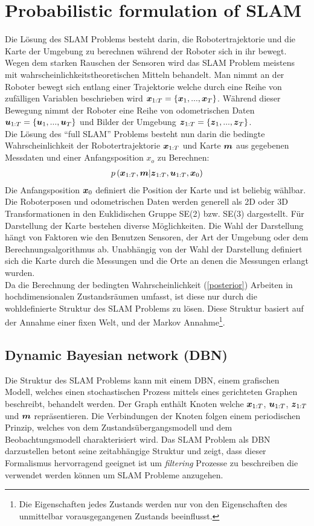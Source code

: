 \documentclass[12pt]{article}
\renewcommand*\vec[1]{{\mbox{\boldmath\ensuremath{#1}}}}
\begin{document}
\section{Probabilistic formulation of SLAM}
Die Lösung des SLAM Problems besteht darin, die Robotertrajektorie und die Karte der Umgebung zu berechnen während der Roboter sich in ihr bewegt.
Wegen dem starken Rauschen der Sensoren wird das SLAM Problem meistens mit wahrscheinlichkeitstheoretischen Mitteln behandelt. Man nimmt an der
Roboter bewegt sich entlang einer Trajektorie welche durch eine Reihe von zufälligen Variablen beschrieben wird
$\vec x_{1:T} = \left\{\vec x_1,...,\vec x_T\right\}$. Während dieser Bewegung nimmt der Roboter eine Reihe von odometrischen Daten
$\vec u_{1:T} = \left\{\vec u_1,...,\vec u_T\right\}$ und Bilder der Umgebung $\vec z_{1:T} = \left\{\vec z_1,...,\vec z_T\right\}$.
\\

Die Lösung des ``full SLAM'' Problems besteht nun darin die bedingte Wahrscheinlichkeit der Robotertrajektorie $\vec x_{1:T}$ und Karte $\vec m$ aus
gegebenen Messdaten und einer Anfangsposition $x_o$ zu Berechnen:
\begin{align}
 \label{posterior}
 p\left(\vec x_{1:T},\vec m|\vec z_{1:T}, \vec u_{1:T}, \vec x_0\right)
\end{align}
Die Anfangsposition $\vec x_0$ definiert die Position der Karte und ist beliebig wählbar. Die Roboterposen und odometrischen Daten werden 
generell als 2D oder 3D Transformationen in den Euklidischen Gruppe SE(2) bzw. SE(3) dargestellt. Für Darstellung der Karte bestehen diverse
Möglichkeiten. Die Wahl der Darstellung hängt von Faktoren wie den Benutzen Sensoren, der Art der Umgebung oder dem Berechnungsalgorithmus ab.
Unabhängig von der Wahl der Darstellung definiert sich die Karte durch die Messungen und die Orte an denen die Messungen erlangt wurden.
\\

Da die Berechnung der bedingten Wahrscheinlichkeit (\ref{posterior}) Arbeiten in hochdimensionalen Zustandsräumen umfasst, ist diese nur durch
die wohldefinierte Struktur des SLAM Problems zu lösen. Diese Struktur basiert auf der Annahme einer fixen Welt, und der Markov
Annahme\footnote{Die Eigenschaften jedes Zustands werden nur von den Eigenschaften des unmittelbar vorausgegangenen Zustands beeinflusst.}.

\subsection{Dynamic Bayesian network (DBN)}
Die Struktur des SLAM Problems kann mit einem DBN, einem grafischen Modell, welches einen stochastischen Prozess mittels eines gerichteten Graphen
beschreibt, behandelt werden. Der Graph enthält Knoten welche $\vec x_{1:T}$, $\vec u_{1:T}$, $\vec z_{1:T}$ und $\vec m$ repräsentieren. Die
Verbindungen der Knoten folgen einem periodischen Prinzip, welches von dem Zustandsübergangsmodell und dem Beobachtungsmodell charakterisiert wird.
Das SLAM Problem als DBN darzustellen betont seine zeitabhängige Struktur und zeigt, dass dieser Formalismus hervorragend geeignet ist um 
\textit{filtering} Prozesse zu beschreiben die verwendet werden können um SLAM Probleme anzugehen.
\end{document}
